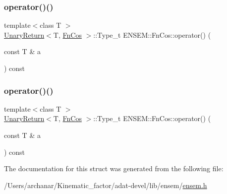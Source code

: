 \mbox{\label{structENSEM_1_1FnCos_a446b9cdd3e854285292e8159b45b0a58}} 
\subsubsection{\texorpdfstring{operator()()}{operator()()}\hspace{0.1cm}{\footnotesize\ttfamily [2/3]}}
{\footnotesize\ttfamily template$<$class T $>$ \\
\mbox{\hyperlink{structENSEM_1_1UnaryReturn}{Unary\+Return}}$<$T, \mbox{\hyperlink{structENSEM_1_1FnCos}{Fn\+Cos}} $>$\+::Type\+\_\+t E\+N\+S\+E\+M\+::\+Fn\+Cos\+::operator() (\begin{DoxyParamCaption}\item[{const T \&}]{a }\end{DoxyParamCaption}) const\hspace{0.3cm}{\ttfamily [inline]}}

\mbox{\label{structENSEM_1_1FnCos_a446b9cdd3e854285292e8159b45b0a58}} 
\subsubsection{\texorpdfstring{operator()()}{operator()()}\hspace{0.1cm}{\footnotesize\ttfamily [3/3]}}
{\footnotesize\ttfamily template$<$class T $>$ \\
\mbox{\hyperlink{structENSEM_1_1UnaryReturn}{Unary\+Return}}$<$T, \mbox{\hyperlink{structENSEM_1_1FnCos}{Fn\+Cos}} $>$\+::Type\+\_\+t E\+N\+S\+E\+M\+::\+Fn\+Cos\+::operator() (\begin{DoxyParamCaption}\item[{const T \&}]{a }\end{DoxyParamCaption}) const\hspace{0.3cm}{\ttfamily [inline]}}



The documentation for this struct was generated from the following file\+:\begin{DoxyCompactItemize}
\item 
/\+Users/archanar/\+Kinematic\+\_\+factor/adat-\/devel/lib/ensem/\mbox{\hyperlink{adat-devel_2lib_2ensem_2ensem_8h}{ensem.\+h}}\end{DoxyCompactItemize}
